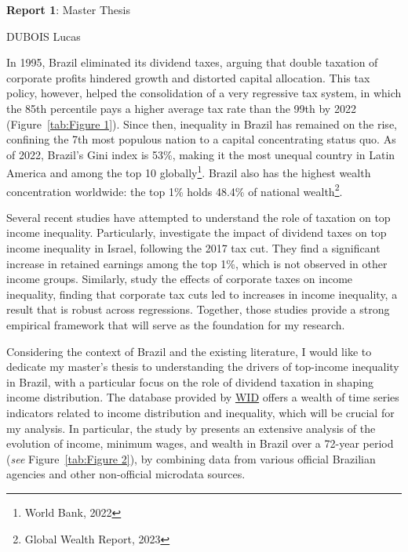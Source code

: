 \documentclass[a4paper, 12pt]{article}
\begin{document}
\begin{center}
    \begin{spacing}{1.75}
        {\LARGE \textbf{Report 1}: Master Thesis}
        \vspace{0.5cm}
    \end{spacing}
    \large{DUBOIS Lucas}
\end{center}

In 1995, Brazil eliminated its dividend taxes, arguing that double taxation of corporate profits hindered growth and distorted capital allocation.
This tax policy, however, helped the consolidation of a very regressive tax system, in which the 85th percentile pays a higher average tax rate than the 99th by 2022 (Figure~\ref{tab:Figure 1}). 
Since then, inequality in Brazil has remained on the rise, confining the 7th most populous nation to a capital concentrating status quo. 
As of 2022, Brazil's Gini index is 53\%, making it the most unequal country in Latin America and among the top 10 globally\footnote{World Bank, 2022}.
Brazil also has the highest wealth concentration worldwide: the top 1\% holds 48.4\% of national wealth\footnote{Global Wealth Report, 2023}.
\par
Several recent studies have attempted to understand the role of taxation on top income inequality. 
Particularly, \cite{berman2024capital} investigate the impact of dividend taxes on top income inequality in Israel, following the 2017 tax cut. 
They find a significant increase in retained earnings among the top 1\%, which is not observed in other income groups.
Similarly, \cite{nallareddy2021corporate} study the effects of corporate taxes on income inequality, finding that corporate tax cuts led to increases in income inequality, a result that is robust across regressions.
Together, those studies provide a strong empirical framework that will serve as the foundation for my research.
\par
Considering the context of Brazil and the existing literature, I would like to dedicate my master’s thesis to understanding the drivers of top-income inequality in Brazil, with a particular focus on the role of dividend taxation in shaping income distribution.
The database provided by \href{https://wid.world/country/brazil/}{WID} offers a wealth of time series indicators related to income distribution and inequality, which will be crucial for my analysis.
In particular, the study by \cite{morgan2025distribution} presents an extensive analysis of the evolution of income, minimum wages, and wealth in Brazil over a 72-year period (\textit{see} Figure~\ref{tab:Figure 2}), by combining data from various official Brazilian agencies and other non-official microdata sources.
\end{document}
